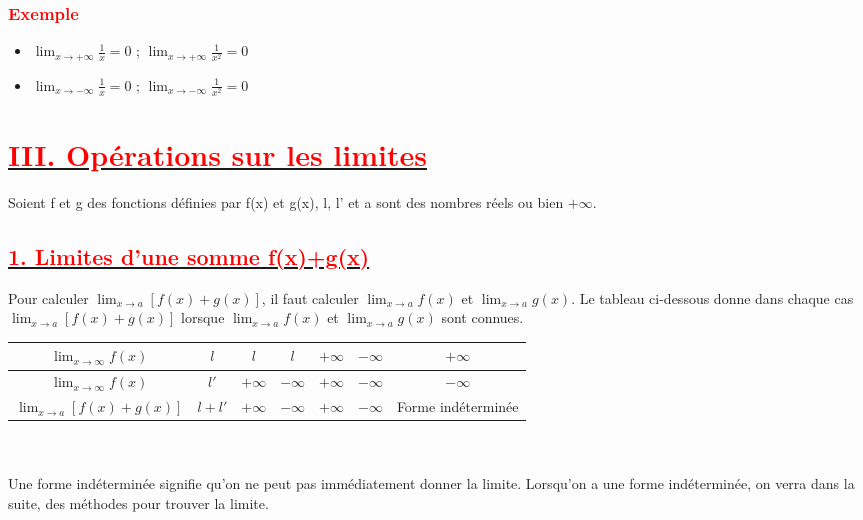 \documentclass[12pt]{article}
\begin{document}
\subsubsection*{\textcolor{red}{Exemple}}
\begin{itemize}
\item $\lim_{x \to +\infty}\frac{1}{x}=0$ ; $\lim_{x \to +\infty}\frac{1}{x^{2}}=0$
\item $\lim_{x \to -\infty}\frac{1}{x}=0$ ; $\lim_{x \to -\infty}\frac{1}{x^{2}}=0$
\end{itemize}


\section*{\underline{\textbf{\textcolor{red}{III. Opérations sur les limites}}}}
Soient f et g des fonctions définies par f(x) et g(x), l, l’ et a sont des nombres réels ou bien $+\infty$.
\subsection*{\underline{\textbf{\textcolor{red}{1. Limites d’une somme f(x)+g(x)}}}}
Pour calculer $\lim_{x \to a}[f(x)+g(x)]$, il faut calculer $\lim_{x \to a}f(x)$ et 
$\lim_{x \to a}g(x)$. Le tableau ci-dessous donne dans chaque cas 
$\lim_{x \to a}[f(x)+g(x)]$ lorsque $\lim_{x \to a}f(x)$ et $\lim_{x \to a}g(x)$ sont connues.\\
\begin{tabular}{|c|c|c|c|c|c|c|}
\hline
$\lim_{x \to \infty}f(x)$ & $l$ & $l$ & $l$ & $+\infty$ & $-\infty$ & $+\infty$ \\
\hline
$\lim_{x \to \infty}f(x)$  & $l'$ & $+\infty$ & $-\infty$ & $+ \infty$ & $-\infty$ & $-\infty$ \\
\hline
$\lim_{x \to a}[f(x)+g(x)]$ & $l+l'$ & $+\infty$ & $-\infty$ & $+\infty$ & $-\infty$ & Forme indéterminée \\
\hline
\end{tabular}
\\\\
Une forme indéterminée signifie qu’on ne peut pas immédiatement donner la limite. Lorsqu’on
a une forme indéterminée, on verra dans la suite, des méthodes pour trouver la limite.
\end{document}
